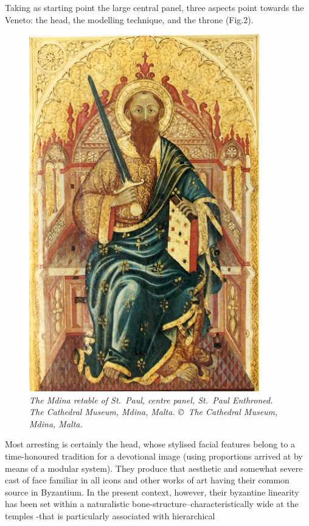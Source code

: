 \documentclass[a4paper,12pt]{article}
\begin{document}
Taking as starting point the large central panel, three aspects point
towards the Veneto: the head, the modelling technique, and the throne
(Fig.2).
\begin{figure}[htbp]
\centering
\includegraphics[width=10cm]{pics/fig2.png}
\caption[The Mdina retable of St.~Paul, centre panel, St.~Paul
  Enthroned.]
{\it The Mdina retable of St.~Paul, centre panel, St.~Paul Enthroned.
The Cathedral Museum, Mdina, Malta. \copyright\ The Cathedral Museum,
  Mdina, Malta.} 
\end{figure}
Most arresting is certainly the head, whose stylised facial
features belong to a time-honoured tradition for a devotional image
(using proportions arrived at by means of a modular system).  They
produce that aesthetic and somewhat severe cast of face familiar in
all icons and other works of art having their common source in
Byzantium.  In the present context, however, their byzantine linearity
has been set within a naturalistic bone-structure--characteristically
wide at the temples -that is particularly associated with hierarchical
\end{document}

